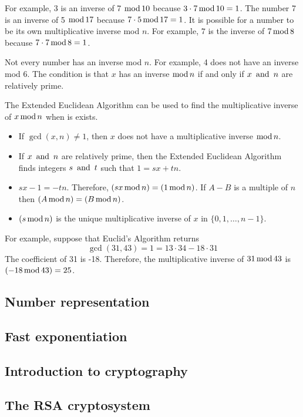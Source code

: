\[
  \qquad
\]

For example, 3 is an inverse of 7 $\operatorname{\text{mod}} 10$ because $3 \cdot 7 \operatorname{\text{mod}} 10 = 1$. The number 7 is an inverse of 5 $\operatorname{\text{mod}} 17$ because $7 \cdot 5 \operatorname{\text{mod}} 17 = 1$. It is possible for a number to be its own multiplicative inverse mod $n$. For example, $7$ is the inverse of $7 \operatorname{\text{mod}} 8$ because $7 \cdot 7 \operatorname{\text{mod}} 8 = 1$.

Not every number has an inverse mod $n$. For example, 4 does not have an inverse mod $6$. The condition is that $x$ has an inverse $\operatorname{\text{mod}} n$ if and only if $x \operatorname{~\text{and}~} n$ are relatively prime.

The Extended Euclidean Algorithm can be used to find the multiplicative inverse of $x \operatorname{\text{mod}} n$ when is exists.
\begin{itemize}
  \item If $\gcd(x, n) \neq 1$, then $x$ does not have a multiplicative inverse $\operatorname{\text{mod}} n$.
  \item If $x \operatorname{~\text{and}~} n$ are relatively prime, then the Extended Euclidean Algorithm finds integers $s \operatorname{~\text{and}~} t$ such that $1 = sx + tn$.
  \item $sx - 1 = -tn$. Therefore, $(sx \operatorname{\text{mod}} n) = (1 \operatorname{\text{mod}} n)$. If $A - B$ is a multiple of $n$ then $(A \operatorname{\text{mod}} n) = (B \operatorname{\text{mod}} n)$.
  \item $(s \operatorname{\text{mod}} n)$ is the unique multiplicative inverse of $x$ in $\{0, 1, \ldots, n-1\}$.
\end{itemize}
For example, suppose that Euclid's Algorithm returns
\[
  \gcd(31, 43) = 1 = 13 \cdot 34 - 18 \cdot 31
\]
The coefficient of 31 is -18. Therefore, the multiplicative inverse of $31 \operatorname{\text{mod}} 43$ is $(-18 \operatorname{\text{mod}} 43) = 25$.

\subsection{Number representation}
\subsection{Fast exponentiation}
\subsection{Introduction to cryptography}
\subsection{The RSA cryptosystem}